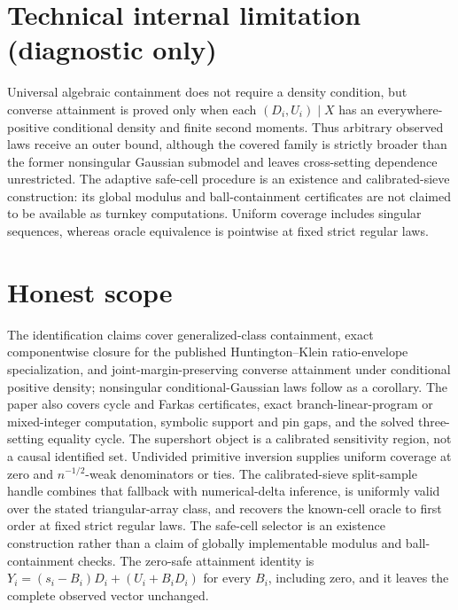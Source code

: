 \documentclass{article}
\begin{document}
\section*{Technical internal limitation (diagnostic only)}

Universal algebraic containment does not require a density condition, but converse attainment is proved only when each \((D_i,U_i)\mid X\) has an everywhere-positive conditional density and finite second moments.  Thus arbitrary observed laws receive an outer bound, although the covered family is strictly broader than the former nonsingular Gaussian submodel and leaves cross-setting dependence unrestricted.  The adaptive safe-cell procedure is an existence and calibrated-sieve construction: its global modulus and ball-containment certificates are not claimed to be available as turnkey computations.  Uniform coverage includes singular sequences, whereas oracle equivalence is pointwise at fixed strict regular laws.

\section{Honest scope}

The identification claims cover generalized-class containment, exact componentwise closure for the published Huntington--Klein ratio-envelope specialization, and joint-margin-preserving converse attainment under conditional positive density; nonsingular conditional-Gaussian laws follow as a corollary.  The paper also covers cycle and Farkas certificates, exact branch-linear-program or mixed-integer computation, symbolic support and pin gaps, and the solved three-setting equality cycle.  The supershort object is a calibrated sensitivity region, not a causal identified set.  Undivided primitive inversion supplies uniform coverage at zero and \(n^{-1/2}\)-weak denominators or ties.  The calibrated-sieve split-sample handle combines that fallback with numerical-delta inference, is uniformly valid over the stated triangular-array class, and recovers the known-cell oracle to first order at fixed strict regular laws.  The safe-cell selector is an existence construction rather than a claim of globally implementable modulus and ball-containment checks.  The zero-safe attainment identity is \(Y_i=(s_i-B_i)D_i+(U_i+B_iD_i)\) for every \(B_i\), including zero, and it leaves the complete observed vector unchanged.
\end{document}
